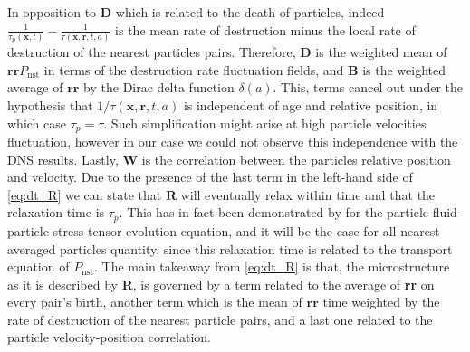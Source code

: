 In opposition to \textbf{D} which is related to the death of particles, indeed $\frac{1}{\tau_p(\textbf{x},t)}
- \frac{1}{\tau(\textbf{x},\textbf{r},t,a)}$ is the mean rate of destruction minus the local rate of destruction of the nearest particles pairs.
Therefore, $\textbf{D}$ is the weighted mean of $\textbf{rr}P_\text{nst}$ in terms of the destruction rate fluctuation fields, and $\textbf{B}$ is the weighted average of $\textbf{rr}$ by the Dirac delta function $\delta(a)$.  
This, terms cancel out under the hypothesis that $1 / \tau(\textbf{x},\textbf{r},t,a)$ is independent of age and relative position, in which case $\tau_p = \tau$. 
Such simplification might arise at high particle velocities fluctuation, however in our case we could not observe this independence with the DNS results.  
Lastly, \textbf{W} is the correlation between the particles relative position and velocity.
Due to the presence of the last term in the left-hand side of \ref{eq:dt_R} we can state that $\textbf{R}$ will eventually relax within time and that the relaxation time is $\tau_p$. 
This has in fact been demonstrated by \citet{zhang2023evolution} for the particle-fluid-particle stress tensor evolution equation, and it will be the case for all nearest averaged particles quantity, since this relaxation time is related to the transport equation of $P_\text{nst}$.
The main takeaway from \ref{eq:dt_R} is that, the microstructure as it is described by \textbf{R}, is governed by a term related to the average of \textbf{rr} on every pair's birth, another term which is the mean of $\textbf{rr}$ time weighted by the rate of destruction of the nearest particle pairs, and a last one related to the particle velocity-position correlation. 


